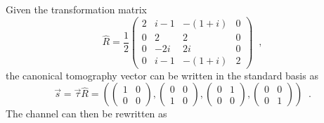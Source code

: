 Given the transformation matrix
$$
\hat{R} = \frac{1}{2}\begin{pmatrix}
2&i-1&-(1+i)&0\\
0&2&2&0\\
0&-2i&2i&0\\
0&i-1&-(1+i)&2
\end{pmatrix}\;\;,
$$
the canonical tomography vector can be written in the standard basis as
$$
\vec{s}=\vec{\tau}\hat{R}=\left(\begin{pmatrix}
1&0\\
0&0
\end{pmatrix},\begin{pmatrix}
0&0\\
1&0
\end{pmatrix},\begin{pmatrix}
0&1\\
0&0
\end{pmatrix},
\begin{pmatrix}
0&0\\
0&1
\end{pmatrix}\right)\;\;.
$$
The channel can then be rewritten as
